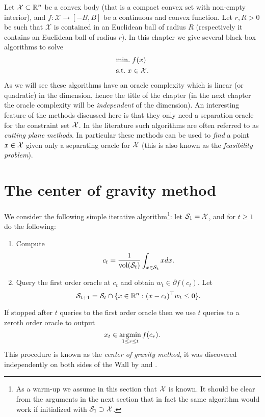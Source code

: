 Let $\mathcal{X} \subset \mathbb{R}^n$ be a convex body (that is a compact convex set with non-empty interior), and $f : \mathcal{X} \rightarrow [-B,B]$ be a continuous and convex function. Let $r, R>0$ be such that $\mathcal{X}$ is contained in an Euclidean ball of radius $R$ (respectively it contains an Euclidean ball of radius $r$). In this chapter we give several black-box algorithms to solve 
\begin{align*}
& \mathrm{min.} \; f(x) \\
& \text{s.t.} \; x \in \mathcal{X} .
\end{align*}
As we will see these algorithms have an oracle complexity which is linear (or quadratic) in the dimension, hence the title of the chapter (in the next chapter the oracle complexity will be {\em independent} of the dimension). An interesting feature of the methods discussed here is that they only need a separation oracle for the constraint set $\mathcal{X}$. In the literature such algorithms are often referred to as {\em cutting plane methods}. In particular these methods can be used to {\em find} a point $x \in \mathcal{X}$ given only a separating oracle for $\mathcal{X}$ (this is also known as the {\em feasibility problem}). 

\section{The center of gravity method} \label{sec:gravity}
We consider the following simple iterative algorithm\footnote{As a warm-up we assume in this section that $\mathcal{X}$ is known. It should be clear from the arguments in the next section that in fact the same algorithm would work if initialized with $\mathcal{S}_1 \supset \mathcal{X}$.}: let $\mathcal{S}_1= \mathcal{X}$, and for $t \geq 1$ do the following:
\begin{enumerate}
\item Compute
\begin{equation}
c_t = \frac{1}{\mathrm{vol}(\mathcal{S}_t)} \int_{x \in \mathcal{S}_t} x dx .
\end{equation}
\item Query the first order oracle at $c_t$ and obtain $w_t \in \partial f (c_t)$. Let
$$\mathcal{S}_{t+1} = \mathcal{S}_t \cap \{x \in \mathbb{R}^n : (x-c_t)^{\top} w_t \leq 0\} .$$
\end{enumerate}
If stopped after $t$ queries to the first order oracle then we use $t$ queries to a zeroth order oracle to output
$$x_t\in \mathop{\mathrm{argmin}}_{1 \leq r \leq t} f(c_r) .$$
This procedure is known as the {\em center of gravity method}, it was discovered independently on both sides of the Wall by \cite{Lev65} and \cite{New65}.

